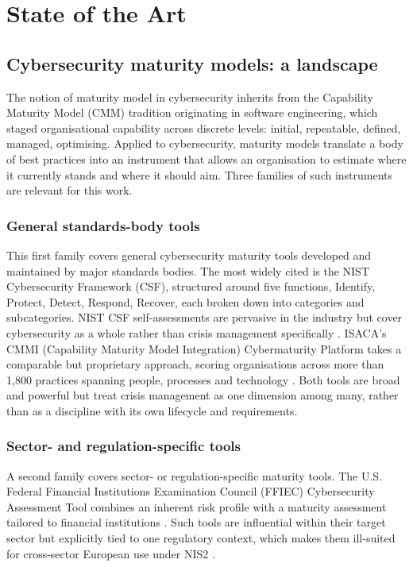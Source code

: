 \chapter{State of the Art}
\label{chap:state-of-the-art}

\section{Cybersecurity maturity models: a landscape}

The notion of maturity model in cybersecurity inherits from the Capability Maturity Model (CMM) tradition originating in software engineering, which staged organisational capability across discrete levels: initial, repeatable, defined, managed, optimising. Applied to cybersecurity, maturity models translate a body of best practices into an instrument that allows an organisation to estimate where it currently stands and where it should aim. Three families of such instruments are relevant for this work.

\subsection{General standards-body tools}
\label{sec:soa-standards-bodies}

This first family covers general cybersecurity maturity tools developed and maintained by major standards bodies. The most widely cited is the NIST Cybersecurity Framework (CSF), structured around five functions, Identify, Protect, Detect, Respond, Recover, each broken down into categories and subcategories. NIST CSF self-assessments are pervasive in the industry but cover cybersecurity as a whole rather than crisis management specifically \cite{nist_csf2_2024}. ISACA's CMMI (Capability Maturity Model Integration) Cybermaturity Platform takes a comparable but proprietary approach, scoring organisations across more than 1,800 practices spanning people, processes and technology \cite{isaca_cmmi_cybermaturity}. Both tools are broad and powerful but treat crisis management as one dimension among many, rather than as a discipline with its own lifecycle and requirements.

\subsection{Sector- and regulation-specific tools}
\label{sec:soa-sector-specific}

A second family covers sector- or regulation-specific maturity tools. The U.S. Federal Financial Institutions Examination Council (FFIEC) Cybersecurity Assessment Tool combines an inherent risk profile with a maturity assessment tailored to financial institutions \cite{ffiec_cat_2017}. Such tools are influential within their target sector but explicitly tied to one regulatory context, which makes them ill-suited for cross-sector European use under NIS2 \cite{nis2_directive_2022}.

